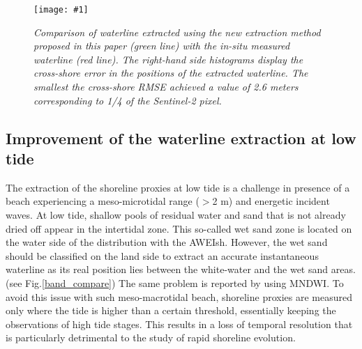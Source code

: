 \documentclass[remotesensing,article,submit,pdftex,moreauthors]{Definitions/mdpi}
\newcommand{\myfigure}[4]{
    \begin{figure*}[h!]
        \centering
        \texttt{[image: \#1]}	 
        \caption{\itshape#2}
        \label{#3}
    \end{figure*} 
}
\begin{document}
\myfigure{img/Results.png}{Comparison of waterline extracted using the new extraction method proposed in this paper (green line) with the in-situ measured waterline (red line). The right-hand side histograms display the cross-shore error in the positions of the extracted waterline. The smallest the cross-shore RMSE achieved a value of 2.6 meters corresponding to 1/4 of the Sentinel-2 pixel.}{validation}{1}

\subsection{Improvement of the waterline extraction at low tide}
    The extraction of the shoreline proxies at low tide is a challenge in presence of a beach experiencing a meso-microtidal range ($>$2 m) and energetic incident waves. \citep{ALMAR2012, CASTELLE2021107707}
    At low tide, shallow pools of residual water and sand that is not already dried off appear in the intertidal zone.
    This so-called wet sand zone is located on the water side of the distribution with the AWEIsh.
    However, the wet sand should be classified on the land side to extract an accurate instantaneous waterline as its real position lies between the white-water and the wet sand areas. (see Fig.\ref{band_compare})
    The same problem is reported by \citep{VOS2019_sub} using MNDWI.
    To avoid this issue with such meso-macrotidal beach, shoreline proxies are measured only where the tide is higher than a certain threshold, essentially keeping the observations of high tide stages.
    This results in a loss of temporal resolution that is particularly detrimental to the study of rapid shoreline evolution.
    
\end{document}
